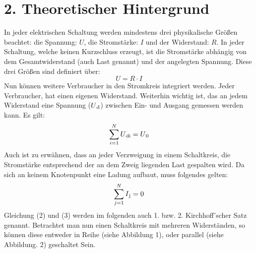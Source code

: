 \documentclass[11pt]{article}
\begin{document}
	\section*{2. Theoretischer Hintergrund}
In jeder elektrischen Schaltung werden mindestens drei physikalische Größen beachtet: die Spannung: $U$, die Stromstärke: $I$ und der Widerstand: $R$. In jeder Schaltung,  welche keinen Kurzschluss erzeugt, ist die Stromstärke abhängig von dem Gesamtwiderstand (auch Last genannt) und der angelegten Spannung. Diese drei Größen sind definiert über:
	\begin{equation}
	U=R\cdot I
	\end{equation}
Nun können weitere Verbraucher in den Stromkreis integriert werden. Jeder Verbraucher, hat einen eigenen Widerstand. Weiterhin wichtig ist, das an jedem Widerstand eine Spannung ($U\textsubscript{d}$) zwischen Ein- und Ausgang gemessen werden kann. Es gilt:
	\begin{equation}
	\sum_{i=1}^{N}U\textsubscript{di}=U\textsubscript{0}
	\end{equation}
Auch ist zu erwähnen, dass an jeder Verzweigung in einem Schaltkreis, die Stromstärke entsprechend der an dem Zweig liegenden Last gespalten wird. Da sich an keinem Knotenpunkt eine Ladung aufbaut, muss folgendes gelten:
	\begin{equation}
	\sum_{j=1}^{N}I\textsubscript{j}=0
	\end{equation}
Gleichung (2) und (3) werden im folgenden auch 1. bzw. 2. Kirchhoff'scher Satz genannt. Betrachtet man nun einen Schaltkreis mit mehreren Widerständen, so können diese entweder in Reihe (siehe Abbildung 1), oder parallel (siehe Abbildung. 2) geschaltet Sein.\\
\end{document}
